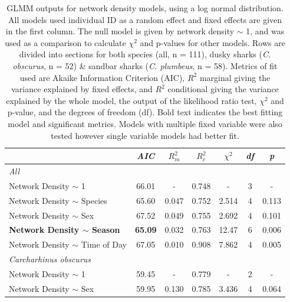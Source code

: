 \documentclass[11pt,a4paper]{article}
\begin{document}
	
	\begin{table}[h!]
		\caption{GLMM outputs for network density models, using a log normal distribution. All models used individual ID as a random effect and fixed effects are given in the first column. The null model is given by network density $\sim$ 1, and was used as a comparison to calculate $\chi^2$ and p-values for other models. Rows are divided into sections for both species (all, n = 111), dusky sharks (\textit{C. obscurus}, n = 52) \& sandbar sharks (\textit{C. plumbeus}, n = 58). Metrics of fit used are Akaike Information Criterion (AIC), $R^2$ marginal giving the variance explained by fixed effects, and $R^2$ conditional giving the variance explained by the whole model, the output of the likelihood ratio test, $\chi^2$ and p-value, and the degrees of freedom (df). Bold text indicates the best fitting model and significant metrics. Models with multiple fixed variable were also tested however single variable models had better fit.}
		\centering
		\begin{tabular}{@{}lcccccc@{}}
			& \textit{AIC} & {$R^2_m$} & {$R^2_c$} & {$\chi^2$} & \textit{df} & \textit{p}      \\ 
			\midrule
			\textit{All}                           &              &              &              &               &             &                 \\
			Network Density $\sim$ 1 & 66.01 & -  & 0.748 & - & 3 & - \\
			Network Density $\sim$ Species          & 65.60        & 0.047        & 0.752        & 2.514         & 4           & 0.113           \\
			Network Density $\sim$ Sex              & 67.52        & 0.049        & 0.755        & 2.692         & 4           & 0.101           \\
			\textbf{Network Density $\sim$ Season}           & \textbf{65.09}        & 0.032        & 0.763        & 12.47         & 6           & 0.006           \\
			Network Density $\sim$ Time of Day      & 67.05        & 0.010        & 0.908        & 7.862         & 4           & 0.005           \\ \midrule
			\textit{Carcharhinus obscurus}         &              &              &              &               &             &                 \\
			Network Density $\sim$ 1 & 59.45 & -  & 0.779 & - & 2 & - \\
			Network Density $\sim$ Sex              & 59.95        & 0.130        & 0.785        & 3.436         & 4           & 0.064           \\

\end{tabular}
\end{table}
\end{document}
